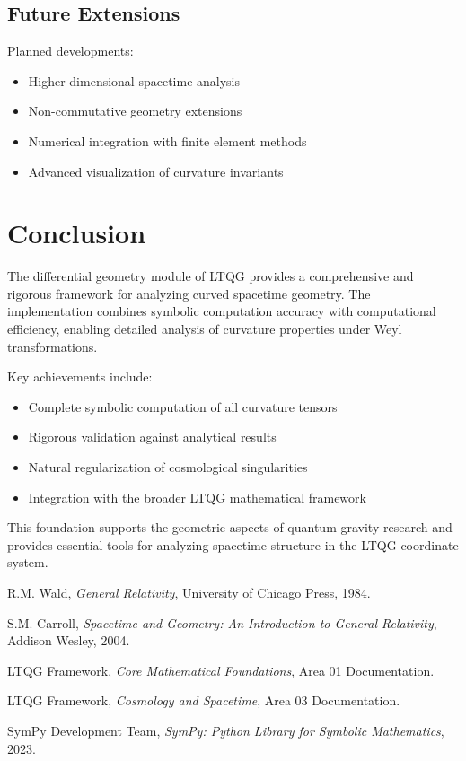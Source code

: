 \documentclass[11pt,a4paper]{article}
\theoremstyle{definition}
\theoremstyle{remark}
\begin{document}
\subsection{Future Extensions}

Planned developments:
\begin{itemize}
\item Higher-dimensional spacetime analysis
\item Non-commutative geometry extensions  
\item Numerical integration with finite element methods
\item Advanced visualization of curvature invariants
\end{itemize}

\section{Conclusion}

The differential geometry module of LTQG provides a comprehensive and rigorous framework for analyzing curved spacetime geometry. The implementation combines symbolic computation accuracy with computational efficiency, enabling detailed analysis of curvature properties under Weyl transformations.

Key achievements include:
\begin{itemize}
\item Complete symbolic computation of all curvature tensors
\item Rigorous validation against analytical results
\item Natural regularization of cosmological singularities
\item Integration with the broader LTQG mathematical framework
\end{itemize}

This foundation supports the geometric aspects of quantum gravity research and provides essential tools for analyzing spacetime structure in the LTQG coordinate system.

\begin{thebibliography}{10}

 R.M. Wald, \textit{General Relativity}, University of Chicago Press, 1984.

 S.M. Carroll, \textit{Spacetime and Geometry: An Introduction to General Relativity}, Addison Wesley, 2004.

 LTQG Framework, \textit{Core Mathematical Foundations}, Area 01 Documentation.

 LTQG Framework, \textit{Cosmology and Spacetime}, Area 03 Documentation.

 SymPy Development Team, \textit{SymPy: Python Library for Symbolic Mathematics}, 2023.

\end{thebibliography}
\end{document}
